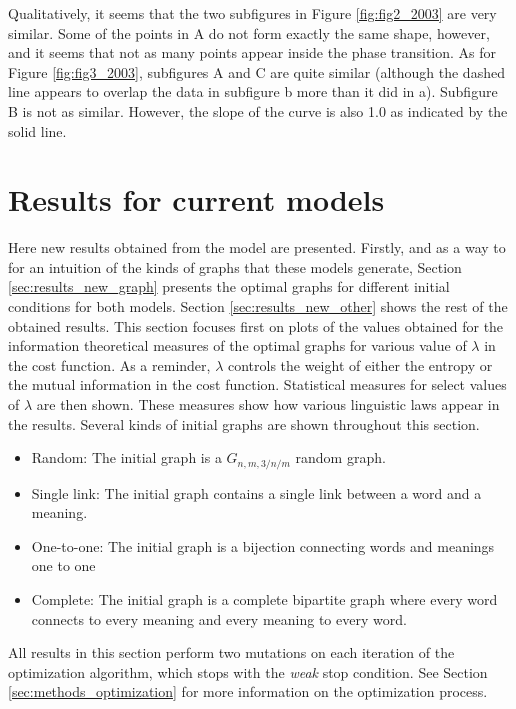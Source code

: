 Qualitatively, it seems that the two subfigures in Figure \ref{fig:fig2_2003} are very similar.
Some of the points in A do not form exactly the same shape, however, and it seems that not as many points appear inside the phase transition.
As for Figure \ref{fig:fig3_2003}, subfigures A and C are quite similar (although the dashed line appears to overlap the data in subfigure b more than it did in a).
Subfigure B is not as similar.
However, the slope of the curve is also 1.0 as indicated by the solid line.

\section{Results for current models}
\label{sec:results_new}

Here new results obtained from the model are presented.
Firstly, and as a way to for an intuition of the kinds of graphs that these models generate, Section \ref{sec:results_new_graph} presents the optimal graphs for different initial conditions for both models.
Section \ref{sec:results_new_other} shows the rest of the obtained results.
This section focuses first on plots of the values obtained for the information theoretical measures of the optimal graphs for various value of $\lambda$ in the cost function.
As a reminder, $\lambda$ controls the weight of either the entropy or the mutual information in the cost function.
Statistical measures for select values of $\lambda$ are then shown.
These measures show how various linguistic laws appear in the results.
Several kinds of initial graphs are shown throughout this section.

\begin{itemize}
\item Random: The initial graph is a $G_{n,m,3/n/m}$ random graph.
\item Single link: The initial graph contains a single link between a word and a meaning.
\item One-to-one: The initial graph is a bijection connecting words and meanings one to one
\item Complete: The initial graph is a complete bipartite graph where every word connects to every meaning and every meaning to every word.
\end{itemize}

All results in this section perform two mutations on each iteration of the optimization algorithm, which stops with the \emph{weak} stop condition.
See Section \ref{sec:methods_optimization} for more information on the optimization process.

